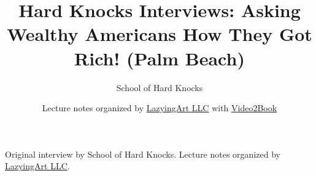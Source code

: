 \documentclass[11pt,oneside]{book}
\begin{document}
\frontmatter
\title{Hard Knocks Interviews: Asking Wealthy Americans How They Got Rich! (Palm Beach)}
\author{School of Hard Knocks}
\date{Lecture notes organized by \href{https://lazying.art}{LazyingArt LLC} with \href{https://github.com/lachlanchen/Video2Book}{Video2Book}}
\maketitle
\begin{center}
\small Original interview by School of Hard Knocks. Lecture notes organized by \href{https://lazying.art}{LazyingArt LLC}.
\end{center}
\clearpage
\mainmatter

\end{document}
